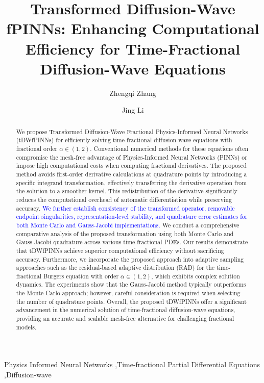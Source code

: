 \documentclass[preprint,3p,times]{elsarticle}
\newcommand{\revise}[1]{\textcolor{blue}{#1}}
\begin{document}
\begin{frontmatter}


\title{Transformed Diffusion-Wave fPINNs: Enhancing Computational Efficiency for Time-Fractional Diffusion-Wave Equations}
\author[1]{Zhengqi Zhang}
\author[1]{Jing Li}
\begin{abstract}
We propose Transformed Diffusion-Wave Fractional Physics-Informed Neural Networks (tDWfPINNs) for efficiently solving time-fractional diffusion-wave equations with fractional order $\alpha \in (1, 2)$. Conventional numerical methods for these equations often compromise the mesh-free advantage of Physics-Informed Neural Networks (PINNs) or impose high computational costs when computing fractional derivatives. The proposed method avoids first-order derivative calculations at quadrature points by introducing a specific integrand transformation, effectively transferring the derivative operation from the solution to a smoother kernel. This redistribution of the derivative significantly reduces the computational overhead of automatic differentiation while preserving accuracy. \revise{We further establish consistency of the transformed operator, removable endpoint singularities, representation-level stability, and quadrature error estimates for both Monte Carlo and Gauss-Jacobi implementations.} We conduct a comprehensive comparative analysis of the proposed transformation using both Monte Carlo and Gauss-Jacobi quadrature across various time-fractional PDEs. Our results demonstrate that tDWfPINNs achieve superior computational efficiency without sacrificing accuracy. Furthermore, we incorporate the proposed approach into adaptive sampling approaches such as the residual-based adaptive distribution (RAD) for the time-fractional Burgers equation with order $\alpha \in (1, 2)$, which exhibits complex solution dynamics. The experiments show that the Gauss-Jacobi method typically outperforms the Monte Carlo approach; however, careful consideration is required when selecting the number of quadrature points. Overall, the proposed tDWfPINNs offer a significant advancement in the numerical solution of time-fractional diffusion-wave equations, providing an accurate and scalable mesh-free alternative for challenging fractional models.
\end{abstract}
  \begin{keyword}
    Physics Informed Neural Networks \sep Time-fractional Partial Differential Equations \sep Diffusion-wave
\end{keyword}


\end{frontmatter}
\end{document}
